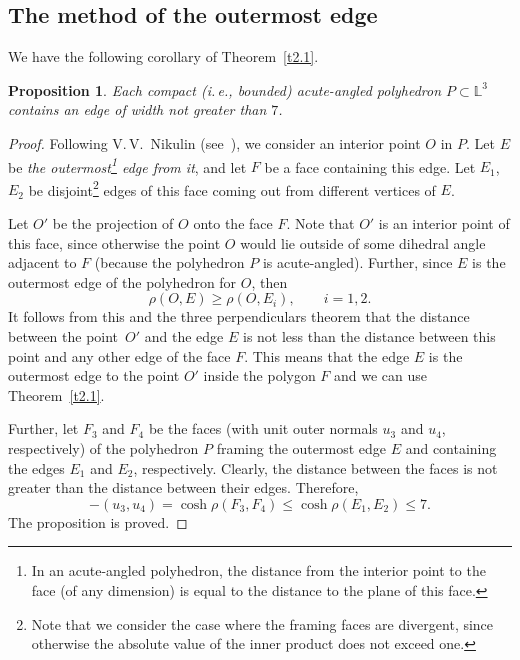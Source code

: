 \documentclass[reqno,12pt]{amsart}
\newtheorem{proposition}{\indent Proposition}%
\begin{document}
\subsection{The method of the outermost edge}
\label{ss2.2}
We have the following corollary of Theorem~\ref{t2.1}.

\begin{proposition}
\label{p2.1}
Each compact (i.\,e., bounded) acute-angled polyhedron
$P \subset \mathbb{L}^3$ contains an edge of width not greater than $7$.
\end{proposition}

\begin{proof}
Following V.\,V.~Nikulin (see\ \cite{Nik81b}), we consider an interior point $O$ in $P$. Let $E$ be
\textit{the outermost\footnote{In an acute-angled polyhedron,
the distance from the interior point to the face (of any dimension) is equal to the
distance to the plane of this face.}
edge from it}, and let $F$ be a face containing this edge.
Let $E_1$, $E_2$ be disjoint\footnote{Note that we consider the case where the framing
faces are divergent, since otherwise the absolute value of the inner product does not exceed one.}
edges of this face coming out from different vertices of $E$.

Let  $O'$ be the projection of  $O$ onto the face $F$. Note that
$O'$ is an interior point of this face, since otherwise the point
$O$ would lie outside of some dihedral angle adjacent to  $F$ (because the polyhedron $P$ is acute-angled).
Further, since $E$ is
the outermost edge of the polyhedron for $O$, then
$$
\rho(O, E) \ge \rho(O, E_i), \qquad i=1, 2.
$$
It follows from this and  the three
perpendiculars theorem that the distance between the point~$O'$
and the edge $E$ is not
less than the distance between this point and any other edge of the face $F$.
This means that the edge $E$ is the outermost edge to the point $O'$
inside the polygon $F$ and we can use Theorem~\ref{t2.1}.


Further, let $F_3$ and $F_4$ be the faces (with unit outer normals $u_3$ and $u_4$,
respectively) of the polyhedron $P$ framing the
outermost edge $E$ and containing the edges $E_1$ and $E_2$, respectively.
Clearly, the distance between the faces is not greater than the distance
between their edges.
Therefore,
$$
-(u_3,u_4)=\cosh \rho(F_3, F_4) \le \cosh \rho(E_1, E_2) \le 7.
$$
The proposition is proved.
\end{proof}
\end{document}
